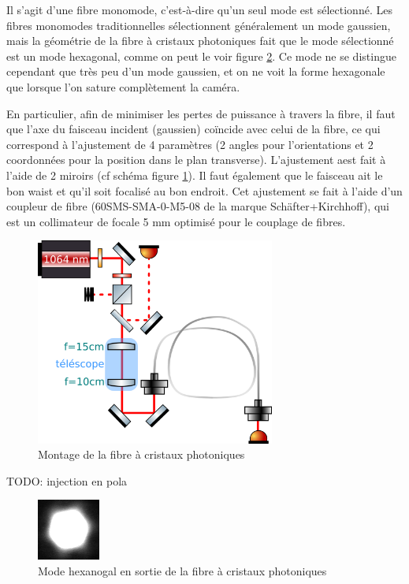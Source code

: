 \documentclass[11pt,a4paper]{article}
\begin{document}
Il s'agit d'une fibre monomode, c'est-à-dire qu'un seul mode est sélectionné. Les fibres monomodes traditionnelles sélectionnent généralement un mode gaussien, mais la géométrie de la fibre à cristaux photoniques fait que le mode sélectionné est un mode hexagonal, comme on peut le voir figure \ref{fig:hexa}. Ce mode ne se distingue cependant que très peu d'un mode gaussien, et on ne voit la forme hexagonale que lorsque l'on sature complètement la caméra.

En particulier, afin de minimiser les pertes de puissance à travers la fibre, il faut que l'axe du faisceau incident (gaussien) coïncide avec celui de la fibre, ce qui correspond à l'ajustement de 4 paramètres (2 angles pour l'orientations et 2 coordonnées pour la position dans le plan transverse). L'ajustement aest fait à l'aide de 2 miroirs (cf schéma figure \ref{fig:couplage}). Il faut également que le faisceau ait le bon waist et qu'il soit focalisé au bon endroit. Cet ajustement se fait à l'aide d'un coupleur de fibre (60SMS-SMA-0-M5-08 de la marque Schäfter+Kirchhoff), qui est un collimateur de focale 5 mm optimisé pour le couplage de fibres. 


\begin{figure}[h]
	\centering
	\includegraphics[width=0.7\textwidth]{./img/schema couplage.png}
	\caption{Montage de la fibre à cristaux photoniques}
	\label{fig:couplage}
\end{figure}



TODO: injection en pola

\begin{figure}[h]
	\centering
	\includegraphics{./img/mode hexa.png}
	\caption{Mode hexanogal en sortie de la fibre à cristaux photoniques}
	\label{fig:hexa}
\end{figure}
\end{document}
